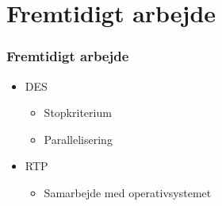 \documentclass[12pt]{beamer}
\newcommand\mc[1]{\multicolumn{1}{c}{\textbf {#1}}} %
\begin{document}

\section{Fremtidigt arbejde}
\begin{frame}
  	\frametitle{Fremtidigt arbejde}
\begin{itemize}
\item DES
	\begin{itemize}
	\item Stopkriterium
	\item Parallelisering
	\end{itemize}
\item RTP
	\begin{itemize}
	\item Samarbejde med operativsystemet
	\end{itemize}
\end{itemize}
\end{frame}
 
\end{document}
